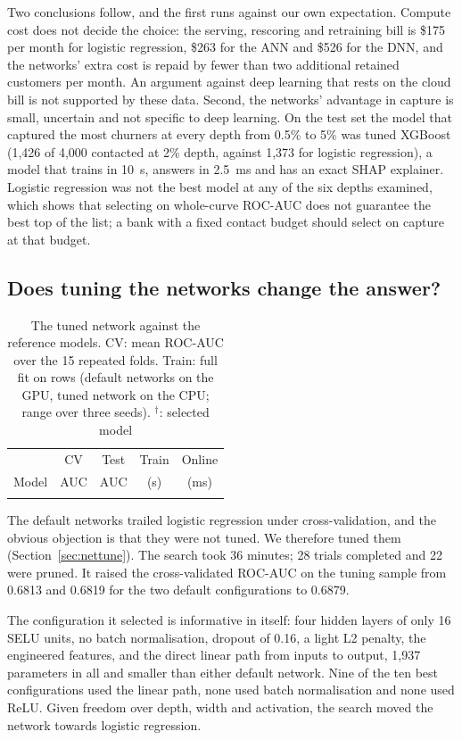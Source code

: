 \documentclass[conference]{IEEEtran}
\begin{document}
Two conclusions follow, and the first runs against our own expectation. Compute cost does not decide the choice: the serving, rescoring and retraining bill is \$175 per month for logistic regression, \$263 for the ANN and \$526 for the DNN, and the networks' extra cost is repaid by fewer than two additional retained customers per month. An argument against deep learning that rests on the cloud bill is not supported by these data. Second, the networks' advantage in capture is small, uncertain and not specific to deep learning. On the test set the model that captured the most churners at every depth from 0.5\% to 5\% was tuned XGBoost (1,426 of 4,000 contacted at 2\% depth, against 1,373 for logistic regression), a model that trains in 10~s, answers in 2.5~ms and has an exact SHAP explainer. Logistic regression was not the best model at any of the six depths examined, which shows that selecting on whole-curve ROC-AUC does not guarantee the best top of the list; a bank with a fixed contact budget should select on capture at that budget.

\subsection{Does tuning the networks change the answer?}\label{sec:nettuneres}
\begin{table}[t]
\caption{The tuned network against the reference models. CV: mean ROC-AUC over the 15 repeated folds. Train: full fit on \NTrain{} rows (default networks on the GPU, tuned network on the CPU; range over three seeds). $^{\dagger}$: selected model}
\label{tab:dltune}
\centering
\footnotesize
\setlength{\tabcolsep}{3.5pt}
\begin{tabular}{@{}lcccc@{}}
\toprule
 & CV & Test & Train & Online \\
Model & AUC & AUC & (s) & (ms) \\
\midrule
\\
\bottomrule
\end{tabular}
\end{table}

The default networks trailed logistic regression under cross-validation, and the obvious objection is that they were not tuned. We therefore tuned them (Section~\ref{sec:nettune}). The search took 36 minutes; 28 trials completed and 22 were pruned. It raised the cross-validated ROC-AUC on the tuning sample from 0.6813 and 0.6819 for the two default configurations to 0.6879.

The configuration it selected is informative in itself: four hidden layers of only 16 SELU units, no batch normalisation, dropout of 0.16, a light L2 penalty, the engineered features, and the direct linear path from inputs to output, 1,937 parameters in all and smaller than either default network. Nine of the ten best configurations used the linear path, none used batch normalisation and none used ReLU. Given freedom over depth, width and activation, the search moved the network towards logistic regression.
\end{document}
